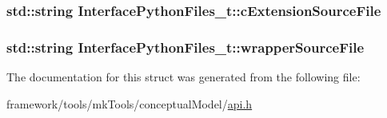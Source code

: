 \subsubsection[{\texorpdfstring{c\+Extension\+Source\+File}{cExtensionSourceFile}}]{\setlength{\rightskip}{0pt plus 5cm}std\+::string Interface\+Python\+Files\+\_\+t\+::c\+Extension\+Source\+File}\hypertarget{struct_interface_python_files__t_a7a637eeb540e016f140556c198f94084}{}\label{struct_interface_python_files__t_a7a637eeb540e016f140556c198f94084}
\subsubsection[{\texorpdfstring{wrapper\+Source\+File}{wrapperSourceFile}}]{\setlength{\rightskip}{0pt plus 5cm}std\+::string Interface\+Python\+Files\+\_\+t\+::wrapper\+Source\+File}\hypertarget{struct_interface_python_files__t_a789df0179efd6f99a3b21e8c8c8cbc09}{}\label{struct_interface_python_files__t_a789df0179efd6f99a3b21e8c8c8cbc09}


The documentation for this struct was generated from the following file\+:\begin{DoxyCompactItemize}
\item 
framework/tools/mk\+Tools/conceptual\+Model/\hyperlink{api_8h}{api.\+h}\end{DoxyCompactItemize}
